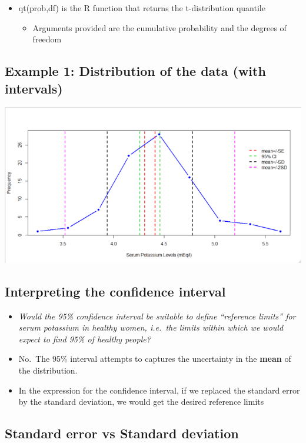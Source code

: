 \documentclass[
]{book}
\providecommand{\tightlist}{%
  \setlength{\itemsep}{0pt}\setlength{\parskip}{0pt}}
\begin{document}
\begin{itemize}
\tightlist
\item
  qt(prob,df) is the R function that returns the t-distribution quantile

  \begin{itemize}
  \tightlist
  \item
    Arguments provided are the cumulative probability and the degrees of freedom
  \end{itemize}
\end{itemize}

\hypertarget{example-1-distribution-of-the-data-with-intervals}{%
\subsection{Example 1: Distribution of the data (with intervals)}\label{example-1-distribution-of-the-data-with-intervals}}

\includegraphics[width=0.5\linewidth]{./3_49}

\hypertarget{interpreting-the-confidence-interval}{%
\subsection{Interpreting the confidence interval}\label{interpreting-the-confidence-interval}}

\begin{itemize}
\tightlist
\item
  \emph{Would the 95\% confidence interval be suitable to define ``reference limits'' for serum potassium in healthy women, i.e.~the limits within which we would expect to find 95\% of healthy people?}
\item
  No.~The 95\% interval attempts to captures the uncertainty in the \textbf{mean} of the distribution.
\item
  In the expression for the confidence interval, if we replaced the standard error by the standard deviation, we would get the desired reference limits
\end{itemize}

\hypertarget{standard-error-vs-standard-deviation}{%
\subsection{Standard error vs Standard deviation}\label{standard-error-vs-standard-deviation}}
\end{document}
